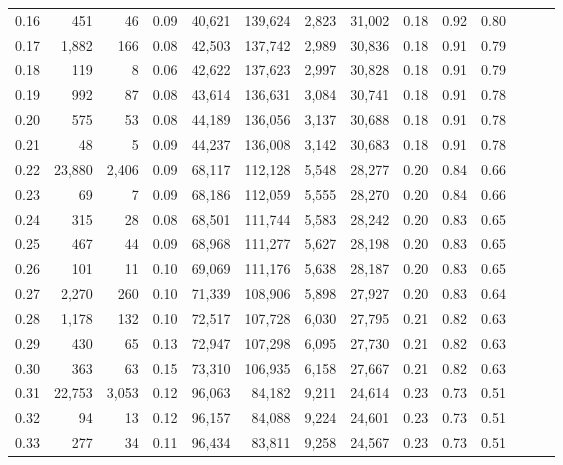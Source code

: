 \begin{tabular}{rrrrrrrrrrrrrr}
0.16 &     451 &     46 &  0.09 &   40,621 &  139,624 &   2,823 &  31,002 &  0.18 &  0.92 &      0.80 \\
0.17 &   1,882 &    166 &  0.08 &   42,503 &  137,742 &   2,989 &  30,836 &  0.18 &  0.91 &      0.79 \\
0.18 &     119 &      8 &  0.06 &   42,622 &  137,623 &   2,997 &  30,828 &  0.18 &  0.91 &      0.79 \\
0.19 &     992 &     87 &  0.08 &   43,614 &  136,631 &   3,084 &  30,741 &  0.18 &  0.91 &      0.78 \\
0.20 &     575 &     53 &  0.08 &   44,189 &  136,056 &   3,137 &  30,688 &  0.18 &  0.91 &      0.78 \\
0.21 &      48 &      5 &  0.09 &   44,237 &  136,008 &   3,142 &  30,683 &  0.18 &  0.91 &      0.78 \\
0.22 &  23,880 &  2,406 &  0.09 &   68,117 &  112,128 &   5,548 &  28,277 &  0.20 &  0.84 &      0.66 \\
0.23 &      69 &      7 &  0.09 &   68,186 &  112,059 &   5,555 &  28,270 &  0.20 &  0.84 &      0.66 \\
0.24 &     315 &     28 &  0.08 &   68,501 &  111,744 &   5,583 &  28,242 &  0.20 &  0.83 &      0.65 \\
0.25 &     467 &     44 &  0.09 &   68,968 &  111,277 &   5,627 &  28,198 &  0.20 &  0.83 &      0.65 \\
0.26 &     101 &     11 &  0.10 &   69,069 &  111,176 &   5,638 &  28,187 &  0.20 &  0.83 &      0.65 \\
0.27 &   2,270 &    260 &  0.10 &   71,339 &  108,906 &   5,898 &  27,927 &  0.20 &  0.83 &      0.64 \\
0.28 &   1,178 &    132 &  0.10 &   72,517 &  107,728 &   6,030 &  27,795 &  0.21 &  0.82 &      0.63 \\
0.29 &     430 &     65 &  0.13 &   72,947 &  107,298 &   6,095 &  27,730 &  0.21 &  0.82 &      0.63 \\
0.30 &     363 &     63 &  0.15 &   73,310 &  106,935 &   6,158 &  27,667 &  0.21 &  0.82 &      0.63 \\
0.31 &  22,753 &  3,053 &  0.12 &   96,063 &   84,182 &   9,211 &  24,614 &  0.23 &  0.73 &      0.51 \\
0.32 &      94 &     13 &  0.12 &   96,157 &   84,088 &   9,224 &  24,601 &  0.23 &  0.73 &      0.51 \\
0.33 &     277 &     34 &  0.11 &   96,434 &   83,811 &   9,258 &  24,567 &  0.23 &  0.73 &      0.51 \\

\end{tabular}
